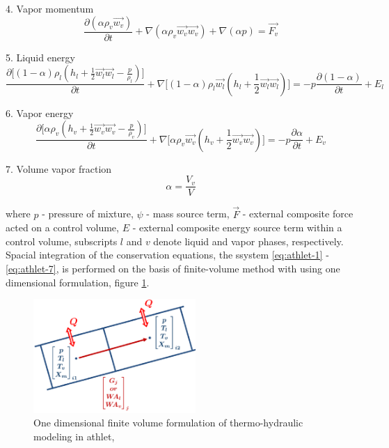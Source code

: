 4. Vapor momentum
\begin{equation} \label{eq:athlet-4}
\frac{\partial (\alpha \rho_{v} \vec{w_{v}})}{\partial t} + \nabla (\alpha \rho_{v} \vec{w_{v}} \vec{w_{v}}) + \nabla (\alpha p) = \vec{F_{v}}
\end{equation}


5. Liquid energy
\begin{equation} \label{eq:athlet-5}
\frac{\partial \Big[ (1-\alpha)\rho_{l}(h_{l} + \frac{1}{2} \vec{w_{l}} \vec{w_{l}} - \frac{p}{\rho_{l}}) \Big]}{\partial t} + \nabla \Big[ (1-\alpha)\rho_{l}\vec{w_{l}}(h_{l} + \frac{1}{2} \vec{w_{l}} \vec{w_{l}}) \Big] = - p \frac{\partial (1 - \alpha)}{\partial t} + E_{l}
\end{equation}


6. Vapor energy
\begin{equation} \label{eq:athlet-6}
\frac{\partial \Big[ \alpha \rho_{v}(h_{v} + \frac{1}{2} \vec{w_{v}} \vec{w_{v}} - \frac{p}{\rho_{v}}) \Big]}{\partial t} + \nabla \Big[ \alpha\rho_{v}\vec{w_{v}}(h_{v} + \frac{1}{2} \vec{w_{v}} \vec{w_{v}}) \Big] = - p \frac{\partial \alpha}{\partial t} + E_{v}
\end{equation}

7. Volume vapor fraction
\begin{equation} \label{eq:athlet-7}
	\alpha = \frac{V_{v}}{V}
\end{equation}


where $p$ - pressure of mixture, $\psi$ - mass source term, $\vec{F}$ - external composite force acted on a control volume, $E$ - external composite energy source term within a control volume, subscripts $l$ and $v$ denote liquid and vapor phases, respectively. \\


Spacial integration of the conservation equations, the ssystem \ref{eq:athlet-1} - \ref{eq:athlet-7}, is performed on the basis of finite-volume method with using one dimensional formulation, figure \ref{fig:introduction-1d-fvm}.


\figpointer{\ref{fig:introduction-1d-fvm}}
\begin{figure}[htpb]
  \centering
  \includegraphics[width=0.55\textwidth]{figures/introduction-1d-fvm.png}
\caption{One dimensional finite volume formulation of thermo-hydraulic modeling in \acrshort{athlet}, \cite{tims-presentation}}
\label{fig:introduction-1d-fvm}
\end{figure}


